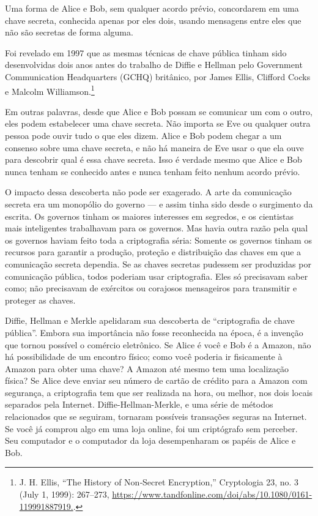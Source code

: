 \documentclass{book}
\begin{document}
%
Uma forma de Alice e Bob, sem qualquer acordo prévio, concordarem em uma chave secreta, conhecida apenas por eles dois, usando mensagens entre eles que não são secretas de forma alguma.
%


Foi revelado em 1997 que as mesmas técnicas de chave pública tinham sido desenvolvidas dois anos antes do trabalho de Diffie e Hellman pelo Government Communication Headquarters (GCHQ) britânico, por James Ellis, Clifford Cocks e Malcolm Williamson.\footnote{J. H. Ellis, “The History of Non‐Secret Encryption,” Cryptologia 23, no. 3 (July 1, 1999): 267–273, \url{https://www.tandfonline.com/doi/abs/10.1080/0161-119991887919.}.}

Em outras palavras, desde que Alice e Bob possam se comunicar um com o outro, eles podem estabelecer uma chave secreta. Não importa se Eve ou qualquer outra pessoa pode ouvir tudo o que eles dizem. Alice e Bob podem chegar a um consenso sobre uma chave secreta, e não há maneira de Eve usar o que ela ouve para descobrir qual é essa chave secreta. Isso é verdade mesmo que Alice e Bob nunca tenham se conhecido antes e nunca tenham feito nenhum acordo prévio.

O impacto dessa descoberta não pode ser exagerado. A arte da comunicação secreta era um monopólio do governo --- e assim tinha sido desde o surgimento da escrita. Os governos tinham os maiores interesses em segredos, e os cientistas mais inteligentes trabalhavam para os governos. Mas havia outra razão pela qual os governos haviam feito toda a criptografia séria: Somente os governos tinham os recursos para garantir a produção, proteção e distribuição das chaves em que a comunicação secreta dependia. Se as chaves secretas pudessem ser produzidas por comunicação pública, todos poderiam usar criptografia. Eles só precisavam saber como; não precisavam de exércitos ou corajosos mensageiros para transmitir e proteger as chaves.

Diffie, Hellman e Merkle apelidaram sua descoberta de ``criptografia de chave pública''. Embora sua importância não fosse reconhecida na época, é a invenção que tornou possível o comércio eletrônico. Se Alice é você e Bob é a Amazon, não há possibilidade de um encontro físico; como você poderia ir fisicamente à Amazon para obter uma chave? A Amazon até mesmo tem uma localização física? Se Alice deve enviar seu número de cartão de crédito para a Amazon com segurança, a criptografia tem que ser realizada na hora, ou melhor, nos dois locais separados pela Internet. Diffie-Hellman-Merkle, e uma série de métodos relacionados que se seguiram, tornaram possíveis transações seguras na Internet. Se você já comprou algo em uma loja online, foi um criptógrafo sem perceber. Seu computador e o computador da loja desempenharam os papéis de Alice e Bob.
\end{document}

